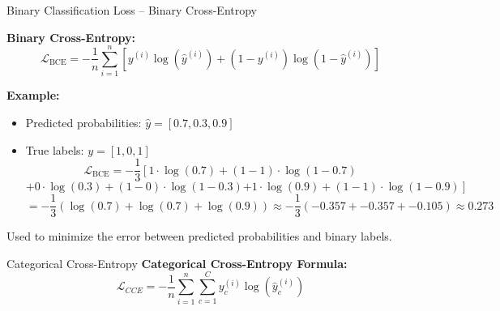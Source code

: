 \documentclass[serif, aspectratio=169]{beamer}
\begin{document}
\begin{frame}{Binary Classification Loss – Binary Cross-Entropy}

    \textbf{Binary Cross-Entropy:}
    \vspace{-0.5cm}
    \[
    \mathcal{L}_{\text{BCE}} = -\frac{1}{n} \sum_{i=1}^{n} \left[ y^{(i)} \log(\hat{y}^{(i)}) + (1 - y^{(i)}) \log(1 - \hat{y}^{(i)}) \right]
    \]
    
    \textbf{Example:}
    \begin{itemize}
        \item Predicted probabilities: \( \hat{y} = [0.7, 0.3, 0.9] \)
        \item True labels: \( y = [1, 0, 1] \)
        \vspace{-0.4cm}
        \[
        \mathcal{L}_{\text{BCE}} = -\frac{1}{3} \left[ 1 \cdot \log(0.7) + (1 - 1) \cdot \log(1 - 0.7) \right.
        \]
        \[
        + 0 \cdot \log(0.3) + (1 - 0) \cdot \log(1 - 0.3) 
        \left. + 1 \cdot \log(0.9) + (1 - 1) \cdot \log(1 - 0.9) \right]
        \]
        \[
        = -\frac{1}{3} \left( \log(0.7) + \log(0.7) + \log(0.9) \right)
        \approx -\frac{1}{3} \left( -0.357 + -0.357 + -0.105 \right) \approx 0.273
        \]
    \end{itemize}
    Used to minimize the error between predicted probabilities and binary labels.
    
\end{frame}

\begin{frame}{Categorical Cross-Entropy}
    \textbf{Categorical Cross-Entropy Formula:}
    \[
    \mathcal{L}_{CCE} = - \frac{1}{n} \sum_{i=1}^{n} \sum_{c=1}^{C} y^{(i)}_c \log(\hat{y}^{(i)}_c)
    \]
\end{frame}
\end{document}
